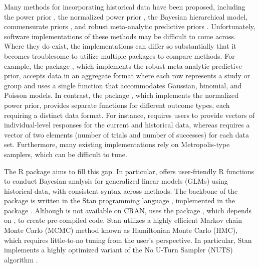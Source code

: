 Many methods for incorporating historical data have been proposed, including the power prior \citep{ibrahim2000power}, the normalized power prior \citep{duan2006evaluating,carvalho2021normalized}, the Bayesian hierarchical model, commensurate priors \citep{hobbs2012commensurate}, and robust meta-analytic predictive priors \citep{schmidli2014robust}. Unfortunately, software implementations of these methods may be difficult to come across.
Where they do exist, the implementations can differ so substantially that it becomes troublesome to utilize multiple packages to compare methods. For example, the  package \citep{weberApplyingMetaAnalyticPredictivePriors2021}, which implements the robust meta-analytic predictive prior, accepts data in an aggregate format where each row represents a study or group and uses a single function that accommodates Gaussian, binomial, and Poisson models. In contrast, the  package \citep{han2021npp}, which implements the normalized power prior, provides separate functions for different outcome types, each requiring a distinct data format. For instance,  requires users to provide vectors of individual-level responses for the current and historical data, whereas  requires a vector of two elements (number of trials and number of successes) for each data set. Furthermore, many existing implementations rely on Metropolis-type samplers, which can be difficult to tune.

The R package  aims to fill this gap. In particular,  offers user-friendly R functions to conduct Bayesian analysis for generalized linear models (GLMs) using historical data, with consistent syntax across methods. The backbone of the package is written in the Stan programming language \citep{carpenter2017stan}, implemented in the  package \citep{cmdstanr_pkg}. Although  is not available on CRAN,  uses the  package \citep{landau2023instantiate}, which depends on , to create pre-compiled code. 
Stan utilizes a highly efficient Markov chain Monte Carlo (MCMC) method known as Hamiltonian Monte Carlo (HMC), which requires little-to-no tuning from the user's perspective. In particular, Stan implements a highly optimized variant of the No U-Turn Sampler (NUTS) algorithm \citep{hoffman2014no}. 


